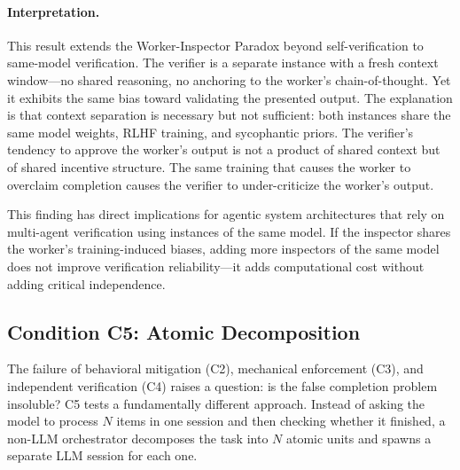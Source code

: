 \paragraph{Interpretation.}
This result extends the Worker-Inspector Paradox beyond self-verification to same-model verification. The verifier is a separate instance with a fresh context window---no shared reasoning, no anchoring to the worker's chain-of-thought. Yet it exhibits the same bias toward validating the presented output. The explanation is that context separation is necessary but not sufficient: both instances share the same model weights, RLHF training, and sycophantic priors. The verifier's tendency to approve the worker's output is not a product of shared context but of shared incentive structure. The same training that causes the worker to overclaim completion causes the verifier to under-criticize the worker's output.

This finding has direct implications for agentic system architectures that rely on multi-agent verification using instances of the same model. If the inspector shares the worker's training-induced biases, adding more inspectors of the same model does not improve verification reliability---it adds computational cost without adding critical independence.


\subsection{Condition C5: Atomic Decomposition}
\label{sec:exp-c5}

The failure of behavioral mitigation (C2), mechanical enforcement (C3), and independent verification (C4) raises a question: is the false completion problem insoluble?
C5 tests a fundamentally different approach.
Instead of asking the model to process $N$ items in one session and then checking whether it finished, a non-LLM orchestrator decomposes the task into $N$ atomic units and spawns a separate LLM session for each one.

